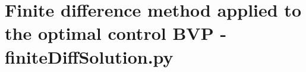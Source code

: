 
\chapter{Finite difference method applied to the optimal control BVP -  finiteDiffSolution.py} %

\label{AppendixF} %









